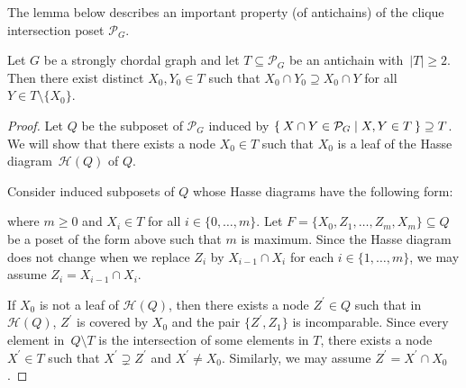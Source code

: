 \documentclass[ALCO, Unicode,published]{cedram}
\newcommand{\mcH}{\mathcal{H}}
\begin{document}
The lemma below describes an important property (of antichains) of the clique intersection poset $ \mathcal{P}_{G} $.
\begin{lemma}\label{leaf}
Let $ G $ be a strongly chordal graph and let $ T \subseteq \mathcal{P}_{G} $ be an antichain with~$ |T| \geq 2 $.
Then there exist distinct $ X_{0}, Y_{0} \in T $ such that $ X_{0} \cap Y_{0} \supseteq X_{0} \cap Y $ for all $ Y \in T \setminus \{X_{0}\} $. 
\end{lemma}
\begin{proof}
Let $ Q $ be the subposet of $ \mathcal{P}_{G} $ induced by $  \Set{X \cap Y \in \mathcal{P}_{G} | X,Y \in T}  \supseteq T$. 
We will show that there exists a node $ X_{0} \in T $ such that $ X_{0} $ is a leaf of the Hasse diagram~$\mcH(Q)$ of $ Q $. 

Consider induced subposets of $ Q $ whose Hasse diagrams have the following form: 
\begin{center}
\end{center}
where $ m \geq 0 $ and $ X_{i} \in T $ for all $ i \in \{0, \dots, m\} $.
Let $F= \{X_{0}, Z_{1}, \dots, Z_{m},X_{m}\} \subseteq Q $ be a poset of the form above such that $ m $ is maximum. 
Since the Hasse diagram does not change when we replace $ Z_{i} $ by $ X_{i-1} \cap X_{i} $ for each $ i \in \{1, \dots, m\} $, we may assume $ Z_{i} = X_{i-1} \cap X_{i} $. 

If $ X_{0} $ is not a leaf of $\mcH(Q)$, then there exists a node $ Z^{\prime} \in Q $ such that in $\mcH(Q)$,  $ Z^{\prime} $ is covered by $ X_{0} $ and the pair $ \{Z^{\prime}, Z_{1}\} $ is incomparable. 
Since every element in~$ Q\setminus T $ is the intersection of some elements in $ T $, there exists a node $ X^{\prime} \in T $ such that $ X^{\prime} \supsetneq Z^{\prime} $ and $ X^{\prime} \neq X_{0} $. 
Similarly, we may assume $ Z^{\prime} = X^{\prime} \cap X_{0} $. 


\end{proof}
\end{document}
